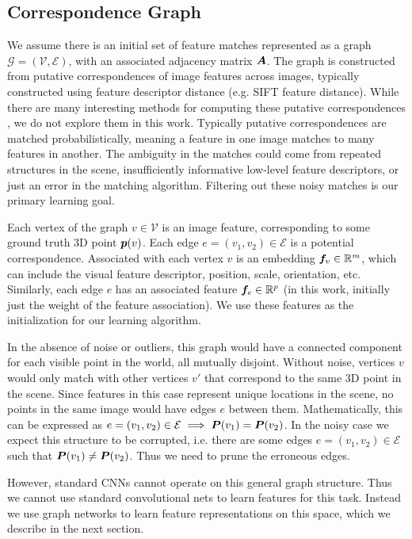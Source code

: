 \documentclass{article} %
\begin{document}
\subsection{Correspondence Graph} \label{sec:corrgraph}
We assume there is an initial set of feature matches represented as a graph $\mathcal{G} = (\mathcal{V}, \mathcal{E})$, with an associated adjacency matrix ${\bm{A}}$.
The graph is constructed from putative correspondences of image features across images, typically constructed using feature descriptor distance (e.g. SIFT feature distance).
While there are many interesting methods for computing these putative correspondences \citep{suh2015subgraph, yi2018learning}, we do not explore them in this work.
Typically putative correspondences are matched probabilistically, meaning a feature in one image matches to many features in another.
The ambiguity in the matches could come from repeated structures in the scene, insufficiently informative low-level feature descriptors, or just an error in the matching algorithm.
Filtering out these noisy matches is our primary learning goal.

Each vertex of the graph $v \in \mathcal{V}$ is an image feature, corresponding to some ground truth 3D point ${\bm{p}}(v)$.
Each edge $e = (v_1, v_2) \in \mathcal{E}$ is a potential correspondence.
Associated with each vertex $v$ is an embedding ${\bm{f}}_v \in {\mathbb{R}}^m$, which can include the visual feature descriptor, position, scale, orientation, etc.
Similarly, each edge $e$ has an associated feature ${\bm{f}}_e \in {\mathbb{R}}^p$ (in this work, initially just the weight of the feature association).
We use these features as the initialization for our learning algorithm.

In the absence of noise or outliers, this graph would have a connected component for each visible point in the world, all mutually disjoint.
Without noise, vertices $v$ would only match with other vertices $v'$ that correspond to the same 3D point in the scene.
Since features in this case represent unique locations in the scene, no points in the same image would have edges $e$ between them.
Mathematically, this can be expressed as $e = (v_1, v_2) \in \mathcal{E} \implies {\bm{P}}(v_1) = {\bm{P}}(v_2)$.
In the noisy case we expect this structure to be corrupted, i.e. there are some edges $e = (v_1, v_2) \in \mathcal{E}$ such that ${\bm{P}}(v_1) \neq {\bm{P}}(v_2)$.
Thus we need to prune the erroneous edges.

However, standard CNNs cannot operate on this general graph structure.
Thus we cannot use standard convolutional nets to learn features for this task.
Instead we use graph networks to learn feature representations on this space, which we describe in the next section.
\end{document}
